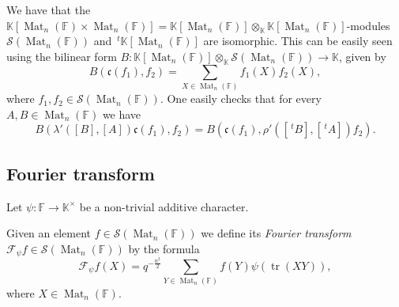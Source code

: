 \documentclass[12pt, reqno]{amsart}
\theoremstyle{definition}
\newcommand{\coefficientsField}{\mathbb{K}}
\newcommand{\multiplicativegroup}[1]{#1^{\times}}
\newcommand{\transpose}[1]{\, {}^{t}#1}
\newcommand{\fieldCharacter}{\psi}
\newcommand{\trace}{\operatorname{tr}}
\newcommand{\finiteField}{\mathbb{F}}
\newcommand{\squareMatrix}{\operatorname{Mat}}
\newcommand{\fourierTransform}[1]{\mathcal{F}_{#1}}
\newcommand{\Schwartz}{\mathcal{S}}
\newcommand{\algebraIsomorphism}{\mathfrak{c}}
\begin{document}
We have that the $\coefficientsField\left[\squareMatrix_n\left(\finiteField\right) \times \squareMatrix_n\left(\finiteField\right)\right] = \coefficientsField\left[\squareMatrix_n\left(\finiteField\right)\right] \otimes_{\coefficientsField} \coefficientsField\left[\squareMatrix_n\left(\finiteField\right)\right]$-modules $\Schwartz\left(\squareMatrix_n\left(\finiteField\right)\right)$ and $\transpose{\coefficientsField\left[\squareMatrix_n\left(\finiteField\right)\right]}$ are isomorphic. This can be easily seen using the bilinear form $B \colon \coefficientsField\left[\squareMatrix_n\left(\finiteField\right)\right] \otimes_{\coefficientsField} \Schwartz\left(\squareMatrix_n\left(\finiteField\right)\right) \to \coefficientsField$, given by
\begin{displaymath}
	B\left(\algebraIsomorphism\left(f_1\right), f_2\right) = \sum_{X \in \squareMatrix_n\left(\finiteField\right)} f_1\left(X\right) f_2\left(X\right),
\end{displaymath}
where $f_1, f_2 \in \Schwartz\left(\squareMatrix_n\left(\finiteField\right)\right)$. One easily checks that for every $A,B \in \squareMatrix_n\left(\finiteField\right)$ we have
\begin{displaymath}
	B\left(\lambda'\left(\left[B\right], \left[A\right]\right)\algebraIsomorphism\left(f_1\right), f_2\right) = B\left(\algebraIsomorphism\left(f_1\right), \rho'\left(\left[\transpose{B}\right], \left[\transpose{A}\right]\right)f_2\right).
\end{displaymath}

\subsection{Fourier transform}
Let $\fieldCharacter \colon \finiteField \to \multiplicativegroup{\coefficientsField}$ be a non-trivial additive character.

Given an element $f \in \Schwartz\left(\squareMatrix_n\left(\finiteField\right)\right)$ we define its \emph{Fourier transform} $\fourierTransform{\fieldCharacter} f \in \Schwartz\left(\squareMatrix_n\left(\finiteField\right)\right)$ by the formula
\begin{displaymath}
\fourierTransform{\fieldCharacter}{f}\left(X\right) = q^{-\frac{n^2}{2}} \sum_{Y \in \squareMatrix_n\left(\finiteField\right)} f\left(Y\right) \fieldCharacter\left(\trace\left(XY\right)\right),
\end{displaymath}
where $X \in \squareMatrix_n\left(\finiteField\right)$.
\end{document}
